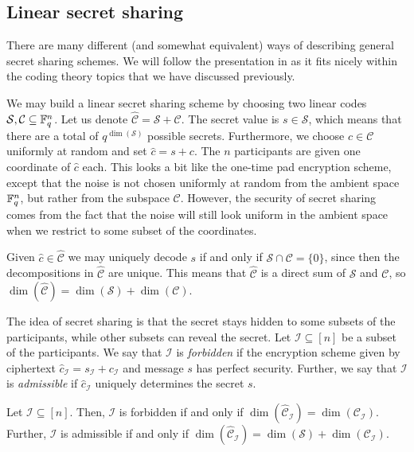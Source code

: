 \documentclass[../main.tex]{subfiles}
\begin{document}
\subsection{Linear secret sharing}

There are many different (and somewhat equivalent) ways of describing general secret sharing schemes. We will follow the presentation in \cite[Section 4.2]{chen2007secure} as it fits nicely within the coding theory topics that we have discussed previously.

We may build a linear secret sharing scheme by choosing two linear codes $\mathcal{S}, \mathcal{C} \subseteq \mathbb{F}_q^n$. Let us denote $\hat{\mathcal{C}} = \mathcal{S} + \mathcal{C}$. The secret value is $s \in \mathcal{S}$, which means that there are a total of $q^{\dim(\mathcal{S})}$ possible secrets. Furthermore, we choose $c \in \mathcal{C}$ uniformly at random and set $\hat{c} = s + c$. The $n$ participants are given one coordinate of $\hat{c}$ each. This looks a bit like the one-time pad encryption scheme, except that the noise is not chosen uniformly at random from the ambient space $\mathbb{F}_q^n$, but rather from the subspace $\mathcal{C}$. However, the security of secret sharing comes from the fact that the noise will still look uniform in the ambient space when we restrict to some subset of the coordinates.

Given $\hat{c} \in \hat{\mathcal{C}}$ we may uniquely decode $s$ if and only if $\mathcal{S} \cap \mathcal{C} = \{0\}$, since then the decompositions in $\hat{\mathcal{C}}$ are unique. This means that $\hat{\mathcal{C}}$ is a direct sum of $\mathcal{S}$ and $\mathcal{C}$, so $\dim(\hat{\mathcal{C}}) = \dim(\mathcal{S}) + \dim(\mathcal{C})$.

The idea of secret sharing is that the secret stays hidden to some subsets of the participants, while other subsets can reveal the secret. Let $\mathcal{I} \subseteq [n]$ be a subset of the participants. We say that $\mathcal{I}$ is \emph{forbidden} if the encryption scheme given by ciphertext $\hat{c}_\mathcal{I} = s_\mathcal{I} + c_\mathcal{I}$ and message $s$ has perfect security. Further, we say that $\mathcal{I}$ is \emph{admissible} if $\hat{c}_\mathcal{I}$ uniquely determines the secret $s$.

\begin{theorem}
Let $\mathcal{I} \subseteq [n]$. Then, $\mathcal{I}$ is forbidden if and only if $\dim(\hat{\mathcal{C}}_\mathcal{I}) = \dim(\mathcal{C}_\mathcal{I})$. Further, $\mathcal{I}$ is admissible if and only if $\dim(\hat{\mathcal{C}}_\mathcal{I}) = \dim(\mathcal{S}) + \dim(\mathcal{C}_\mathcal{I})$.
\end{theorem}
\end{document}

